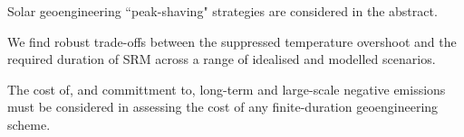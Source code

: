\documentclass[draft]{agujournal2019}
\begin{document}




\begin{keypoints}
\item Solar geoengineering ``peak-shaving" strategies are considered in the abstract.
\item We find robust trade-offs between the suppressed temperature overshoot and the required duration of SRM across a range of idealised and modelled scenarios.
\item The cost of, and committment to, long-term and large-scale negative emissions must be considered in assessing the cost of any finite-duration geoengineering scheme. 
\end{keypoints}

%
%

%
%
\end{document}
